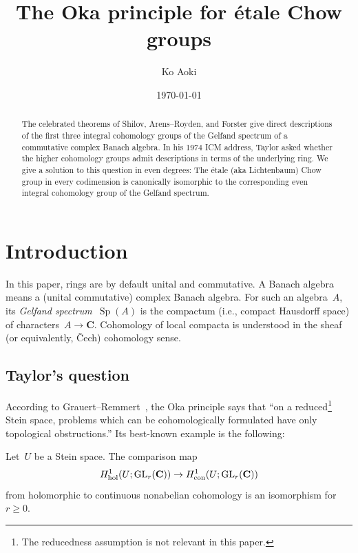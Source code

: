 \documentclass[11pt,a4paper]{amsart}
\title{The Oka principle for étale Chow groups}
\author{Ko Aoki}
\date{\today}
\numberwithin{equation}{section}
\theoremstyle{plain}
\theoremstyle{definition}
\theoremstyle{remark}
\newcommand{\CC}{\mathbf{C}}
\newcommand{\con}{\textnormal{con}}
\newcommand{\hol}{\textnormal{hol}}
\newcommand{\GL}{\operatorname{GL}}
\newcommand{\Sp}{\operatorname{Sp}}
\begin{document}
\begin{abstract}
  The celebrated theorems of Shilov, Arens–Royden, and Forster
  give direct descriptions
  of the first three integral cohomology groups
  of the Gelfand spectrum of a commutative complex Banach algebra.
  In his 1974 ICM address,
  Taylor asked whether the higher cohomology groups admit descriptions
  in terms of the underlying ring.
  We give a solution to this question in even degrees:
  The étale (aka Lichtenbaum) Chow group
  in every codimension
  is canonically isomorphic
  to the corresponding even integral cohomology group
  of the Gelfand spectrum.
\end{abstract}

\maketitle


\section{Introduction}\label{s:intro}

In this paper,
rings are by default unital and commutative.
A Banach algebra means a (unital commutative) complex Banach algebra.
For such an algebra~\(A\),
its \emph{Gelfand spectrum}~\(\Sp(A)\) is
the compactum (i.e., compact Hausdorff space) of characters~\(A\to\CC\).
Cohomology of local compacta
is understood in the sheaf (or equivalently,
Čech) cohomology sense.

\subsection{Taylor’s question}\label{ss:taylor}

According to Grauert–Remmert~\cite[page~145]{GrauertRemmert79}, the Oka
principle says that “on a reduced\footnote{The reducedness assumption is not relevant in this paper.
} Stein space, problems which can be
cohomologically formulated have only topological obstructions.”  Its
best-known example is the following:

\begin{theorem}[Grauert]\label{grauert}
  Let~\(U\) be a Stein space. The comparison map
  \begin{equation*}
    H^{1}_{\hol}(U;\GL_{r}(\CC))
    \to
    H^{1}_{\con}(U;\GL_{r}(\CC))
  \end{equation*}
  from holomorphic to continuous nonabelian cohomology is an
  isomorphism for \(r\geq0\).
\end{theorem}
\end{document}
